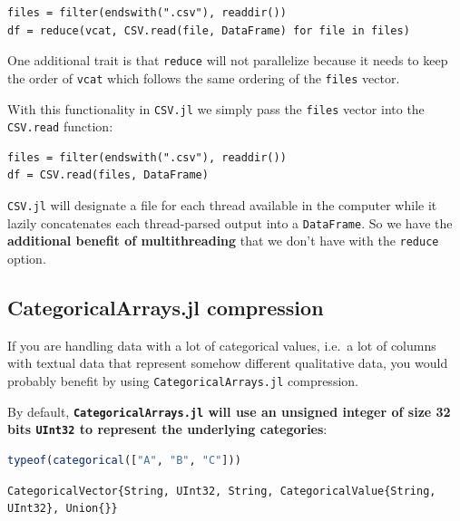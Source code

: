 \documentclass[
  notoc %
]{tufte-book}
\newcommand{\passthrough}[1]{#1}
\begin{document}
\begin{lstlisting}
files = filter(endswith(".csv"), readdir())
df = reduce(vcat, CSV.read(file, DataFrame) for file in files)
\end{lstlisting}

One additional trait is that \passthrough{\lstinline!reduce!} will not
parallelize because it needs to keep the order of
\passthrough{\lstinline!vcat!} which follows the same ordering of the
\passthrough{\lstinline!files!} vector.

With this functionality in \passthrough{\lstinline!CSV.jl!} we simply
pass the \passthrough{\lstinline!files!} vector into the
\passthrough{\lstinline!CSV.read!} function:

\begin{lstlisting}
files = filter(endswith(".csv"), readdir())
df = CSV.read(files, DataFrame)
\end{lstlisting}

\passthrough{\lstinline!CSV.jl!} will designate a file for each thread
available in the computer while it lazily concatenates each
thread-parsed output into a \passthrough{\lstinline!DataFrame!}. So we
have the \textbf{additional benefit of multithreading} that we don't
have with the \passthrough{\lstinline!reduce!} option.

\hypertarget{sec:df_performance_categorical_compression}{%
\subsection{CategoricalArrays.jl
compression}\label{sec:df_performance_categorical_compression}}

If you are handling data with a lot of categorical values, i.e.~a lot of
columns with textual data that represent somehow different qualitative
data, you would probably benefit by using
\passthrough{\lstinline!CategoricalArrays.jl!} compression.

By default, \textbf{\passthrough{\lstinline!CategoricalArrays.jl!} will
use an unsigned integer of size 32 bits \passthrough{\lstinline!UInt32!}
to represent the underlying categories}:

\begin{lstlisting}[language=Julia]
typeof(categorical(["A", "B", "C"]))
\end{lstlisting}

\begin{lstlisting}
CategoricalVector{String, UInt32, String, CategoricalValue{String, UInt32}, Union{}}
\end{lstlisting}
\end{document}
